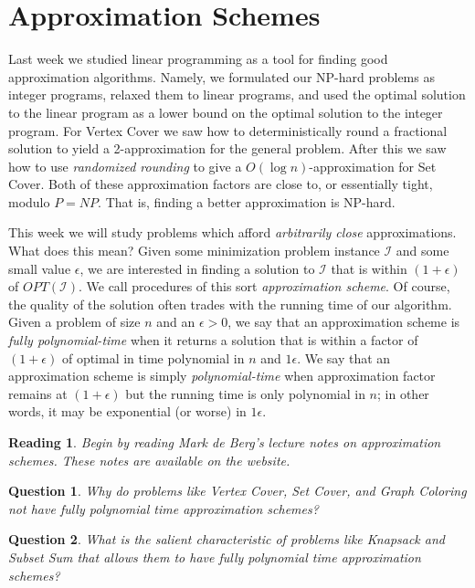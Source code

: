 \documentclass[11pt]{article}
\newtheorem{question}{Question}
\newtheorem{reading}{Reading}
\begin{document}
\section{Approximation Schemes}

Last week we studied linear programming as a tool for finding good approximation algorithms.  Namely, we formulated our NP-hard problems as integer programs, relaxed them to linear programs, and used the optimal solution to the linear program as a lower bound on the optimal solution to the integer program.  For {\sc Vertex Cover} we saw how to deterministically round a fractional solution to yield a 2-approximation for the general problem.  After this we saw how to use {\em randomized rounding} to give a $O(\log n)$-approximation for {\sc Set Cover}.  Both of these approximation factors are close to, or essentially tight, modulo $P=NP$.  That is, finding a better approximation is NP-hard.

This week we will study problems which afford {\em arbitrarily close} approximations.  What does this mean?  Given some minimization problem instance $\mathcal{I}$ and some small value $\epsilon$, we are interested in finding a solution to $\mathcal{I}$ that is within $(1+\epsilon)$ of $OPT(\mathcal{I})$.  We call procedures of this sort {\em approximation scheme}.  Of course, the quality of the solution often trades with the running time of our algorithm.  Given a problem of size $n$ and an $\epsilon > 0$, we say that an approximation scheme is {\em fully polynomial-time} when it returns a solution that is within a factor of $(1+\epsilon)$ of optimal in time polynomial in $n$ and $1\epsilon$.  We say that an approximation scheme is simply {\em polynomial-time} when approximation factor remains at $(1+\epsilon)$ but the running time is only polynomial in $n$; in other words, it may be exponential (or worse) in $1\epsilon$.

\begin{reading}
Begin by reading Mark de Berg's lecture notes on approximation schemes.  These notes are available on the website.
\end{reading}

\begin{question}
Why do problems like {\sc Vertex Cover}, {\sc Set Cover}, and {\sc Graph Coloring} not have {\em fully} polynomial time approximation schemes?
\end{question}

\begin{question}
What is the salient characteristic of problems like {\sc Knapsack} and {\sc Subset Sum} that allows them to have {\em fully} polynomial time approximation schemes?
\end{question}
\end{document}

